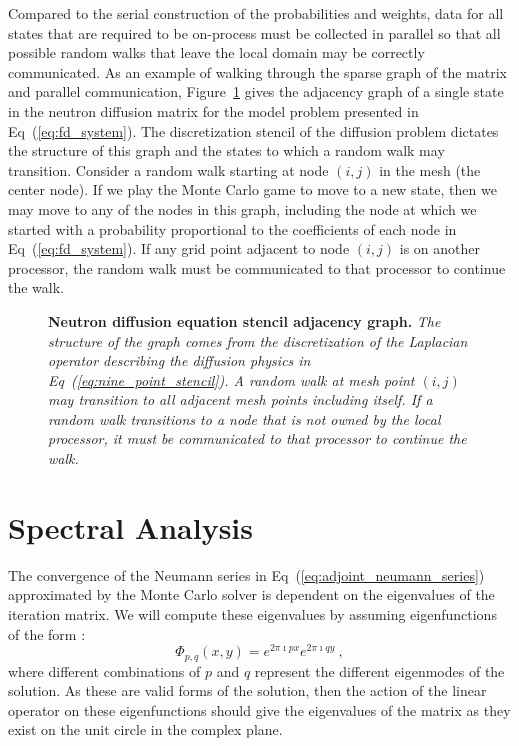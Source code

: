 \documentclass[preprint,11pt]{elsarticle}
\begin{document}
Compared to the serial construction of the probabilities and weights, data for
all states that are required to be on-process must be collected in parallel so
that all possible random walks that leave the local domain may be correctly
communicated. As an example of walking through the sparse graph of the matrix
and parallel communication, Figure~\ref{fig:diffusion_graph} gives the
adjacency graph of a single state in the neutron diffusion matrix for the
model problem presented in Eq~(\ref{eq:fd_system}). The discretization stencil
of the diffusion problem dictates the structure of this graph and the states
to which a random walk may transition. Consider a random walk starting at node
$(i,j)$ in the mesh (the center node). If we play the Monte Carlo game to move
to a new state, then we may move to any of the nodes in this graph, including
the node at which we started with a probability proportional to the
coefficients of each node in Eq~(\ref{eq:fd_system}). If any grid point
adjacent to node $(i,j)$ is on another processor, the random walk must be
communicated to that processor to continue the walk.

\begin{figure}[ht!]
  \begin{center}
    \scalebox{1.25}{  }
  \end{center}
  \caption{\textbf{Neutron diffusion equation stencil adjacency graph.}
    \textit{The structure of the graph comes from the discretization of the
      Laplacian operator describing the diffusion physics in
      Eq~(\ref{eq:nine_point_stencil}). A random walk at mesh point $(i,j)$
      may transition to all adjacent mesh points including itself. If a
      random walk transitions to a node that is not owned by the local
      processor, it must be communicated to that processor to continue the
      walk.}}
  \label{fig:diffusion_graph}
\end{figure}

\section{Spectral Analysis}
\label{sec:spectral_analysis}

The convergence of the Neumann series in
Eq~(\ref{eq:adjoint_neumann_series}) approximated by the Monte Carlo
solver is dependent on the eigenvalues of the iteration matrix. We
will compute these eigenvalues by assuming eigenfunctions of the form
\cite{leveque_finite_2007}:
\begin{equation}
  \Phi_{p,q}(x,y) = e^{2 \pi \imath p x} e^{2 \pi \imath q y}\:,
  \label{eq:eigenfunction_form}
\end{equation}
where different combinations of $p$ and $q$ represent the different
eigenmodes of the solution. As these are valid forms of the solution,
then the action of the linear operator on these eigenfunctions should
give the eigenvalues of the matrix as they exist on the unit circle in
the complex plane.
\end{document}
